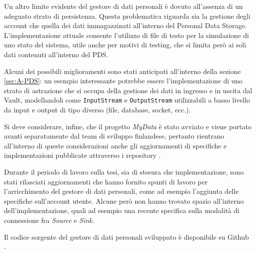Un altro limite evidente del gestore di dati personali \`e dovuto all’assenza di un adeguato strato di persistenza. Questa problematica riguarda sia la gestione degli account che quella dei dati immagazzinati all’interno del Personal Data Storage. L’implementazione attuale consente l’utilizzo di file di testo per la simulazione di uno stato del sistema, utile anche per motivi di testing, che si limita per\`o ai soli dati contenuti all’interno del PDS.

Alcuni dei possibili miglioramenti sono stati anticipati all’interno della sezione \ref{sec:A-PDS}: un esempio interessante potrebbe essere l’implementazione di uno strato di astrazione che si occupa della gestione dei dati in ingresso e in uscita dal Vault, modellandoli come \texttt{InputStream} e \texttt{OutputStream} utilizzabili a basso livello da input e output di tipo diverso (file, database, socket, ecc.).

Si deve considerare, infine, che il progetto \textit{MyData} \`e stato avviato e viene portato avanti separatamente dal team di sviluppo finlandese, pertanto rientrano all’interno di queste considerazioni anche gli aggiornamenti di specifiche e implementazioni pubblicate attraverso i repository \cite{githubmydatastack} \cite{githubmobilityprofile} \cite{githubjourneyplanner} \cite{githubmydatasdk}.

Durante il periodo di lavoro sulla tesi, sia di stesura che implementazione, sono stati rilasciati aggiornamenti che hanno fornito spunti di lavoro per l’arricchimento del gestore di dati personali, come ad esempio l’aggiunta delle specifiche sull’account utente. Alcune per\`o non hanno trovato spazio all’interno dell’implementazione, quali ad esempio una recente specifica sulla modalit\`a di connessione fra \textit{Source} e \textit{Sink}.

Il codice sorgente del gestore di dati personali sviluppato \`e disponibile su Github \cite{githubthesis}.
